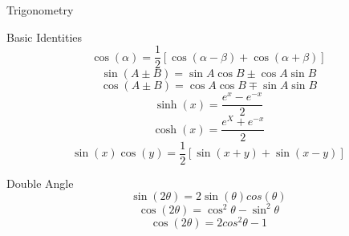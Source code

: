 \newpage
\begin{section}{Trigonometry}
\begin{subsection}{Basic Identities}
$$ \cos (\alpha) = \frac{1}{2} [\cos (\alpha - \beta) + \cos (\alpha + \beta) ] $$
$$\sin (A \pm B) = \sin A \cos B \pm \cos A \sin B$$
$$\cos (A \pm B) = \cos A \cos B \mp \sin A \sin B $$
$$\sinh (x) = \frac{e^x - e ^ {-x} } {2}$$
$$\cosh (x) = \frac{e^{X} + e^{-x} } {2} $$
$$\sin (x) \cos (y) = \frac{1}{2}[\sin (x+y) + \sin (x-y) ] $$

\end{subsection}
\begin{subsection}{Double Angle}
	$$\sin(2 \theta) = 2 \sin ( \theta ) cos (\theta) $$
	$$\cos(2 \theta) = \cos^2 \theta - \sin^2 \theta $$
	$$\cos(2 \theta) = 2 cos^2 \theta - 1 $$
	

\end{subsection}
\end{section}




